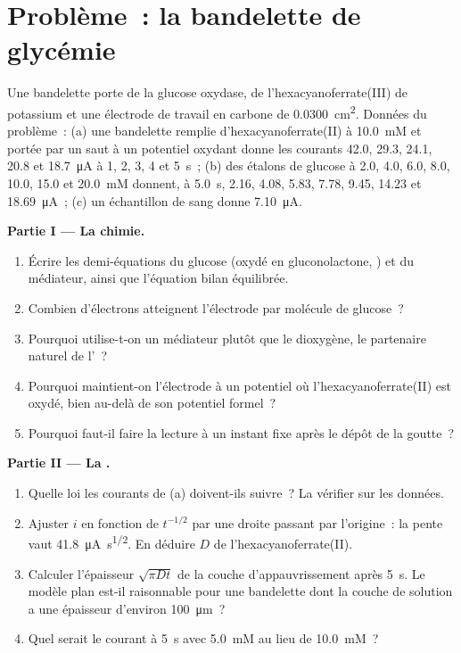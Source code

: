\section{Problème~: la bandelette de glycémie}

\begin{problem}
\label{pb:b3:electrode-kinetics:1}
Une bandelette porte de la glucose oxydase, de l'hexacyanoferrate(III) de
potassium et une électrode de travail en carbone de \qty{0.0300}{cm^2}.
Données du problème~: (a) une bandelette remplie
d'hexacyanoferrate(II) à \qty{10.0}{mM} et portée par un saut à un
potentiel oxydant
donne les courants 42.0, 29.3, 24.1, 20.8 et \qty{18.7}{\micro A} à 1,
2, 3, 4 et \qty{5}{s}~;
(b) des étalons de glucose à 2.0, 4.0, 6.0, 8.0, 10.0, 15.0 et
\qty{20.0}{mM} donnent, à
\qty{5.0}{s}, 2.16, 4.08, 5.83, 7.78, 9.45, 14.23 et \qty{18.69}{\micro A}~;
(c) un échantillon de sang donne
\qty{7.10}{\micro A}.

\medskip\noindent\textbf{Partie I --- La chimie.}
\begin{enumerate}
  \item Écrire les demi-équations du glucose (oxydé en gluconolactone,
        ) et du médiateur, ainsi que l'équation bilan
        équilibrée.
  \item Combien d'électrons atteignent l'électrode par molécule de
        glucose~?
  \item Pourquoi utilise-t-on un médiateur plutôt que le dioxygène, le
        partenaire naturel de l'~?
  \item Pourquoi maintient-on l'électrode à un potentiel où
        l'hexacyanoferrate(II) est oxydé, bien au-delà de son potentiel
        formel~?
  \item Pourquoi faut-il faire la lecture à un instant fixe après le
        dépôt de la goutte~?
\end{enumerate}

\medskip\noindent\textbf{Partie II --- La .}
\begin{enumerate}[resume]
  \item Quelle loi les courants de (a) doivent-ils suivre~? La vérifier
        sur les données.
  \item Ajuster $i$ en fonction de $t^{-1/2}$ par une droite passant par
        l'origine~: la pente vaut \qty{41.8}{\micro A.s^{1/2}}. En déduire
        $D$ de l'hexacyanoferrate(II).
  \item Calculer l'épaisseur $\sqrt{\pi Dt}$ de la couche
        d'appauvrissement après \qty{5}{s}. Le modèle plan est-il
        raisonnable pour une bandelette dont la couche de solution a une
        épaisseur d'environ
        \qty{100}{\micro m}~?
  \item Quel serait le courant à \qty{5}{s} avec \qty{5.0}{mM} au lieu de
        \qty{10.0}{mM}~?
\end{enumerate}


\end{problem}
